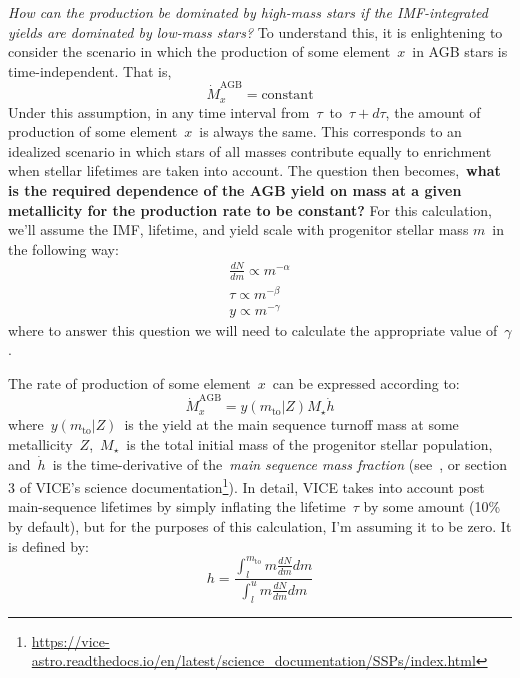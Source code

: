 \documentclass[12pt]{report}
\newcommand\twolineskip{\par\noindent\null\par\noindent}
\newcommand{\ddfrac}[2]{\frac{\displaystyle #1}{\displaystyle #2}}
\begin{document}
\twolineskip 
{\Large \textit{How can the production be dominated by high-mass stars if the 
IMF-integrated yields are dominated by low-mass stars?}} 
To understand this, it is enlightening to consider the scenario in which the 
production of some element~$x$~in AGB stars is time-independent. That is, 
\begin{equation} 
\dot{M}_x^\text{AGB} = \text{constant} 
\end{equation} 
Under this assumption, in any time interval from~$\tau$~to~$\tau + d\tau$, the 
amount of production of some element~$x$~is always the same. This corresponds 
to an idealized scenario in which stars of all masses contribute equally to 
enrichment when stellar lifetimes are taken into account. The question then 
becomes,~\textbf{what is the required dependence of the AGB yield on mass at a 
given metallicity for the production rate to be constant?} For this calculation, 
we'll assume the IMF, lifetime, and yield scale with progenitor stellar mass 
$m$~in the following way: 
\begin{subequations}\begin{align} 
\frac{dN}{dm} \propto m^{-\alpha} \\ 
\tau \propto m^{-\beta} \\ 
y \propto m^{-\gamma} 
\end{align}\end{subequations} 
where to answer this question we will need to calculate the appropriate value 
of~$\gamma$. 
\par 
The rate of production of some element~$x$~can be expressed according to: 
\begin{equation} 
\dot{M}_x^\text{AGB} = y(m_\text{to}|Z) M_\star \dot{h} 
\end{equation} 
where~$y(m_\text{to}|Z)$~is the yield at the main sequence turnoff mass at some 
metallicity~$Z$,~$M_\star$~is the total initial mass of the progenitor stellar 
population, and~$\dot{h}$~is the time-derivative of the~\textit{main sequence 
mass fraction} (see~\citet{Johnson2020}, or section 3 of VICE's science 
documentation\footnote{
	\url{https://vice-astro.readthedocs.io/en/latest/science_documentation/SSPs/index.html}
}). In detail, VICE takes into account post main-sequence lifetimes by simply 
inflating the lifetime~$\tau$ by some amount (10\% by default), but for the 
purposes of this calculation, I'm assuming it to be zero. It is defined by: 
\begin{equation} 
h = \ddfrac{
	\int_l^{m_\text{to}} m \frac{dN}{dm} dm 
}{
	\int_l^u m \frac{dN}{dm} dm 
}
\end{equation} 
\end{document}
